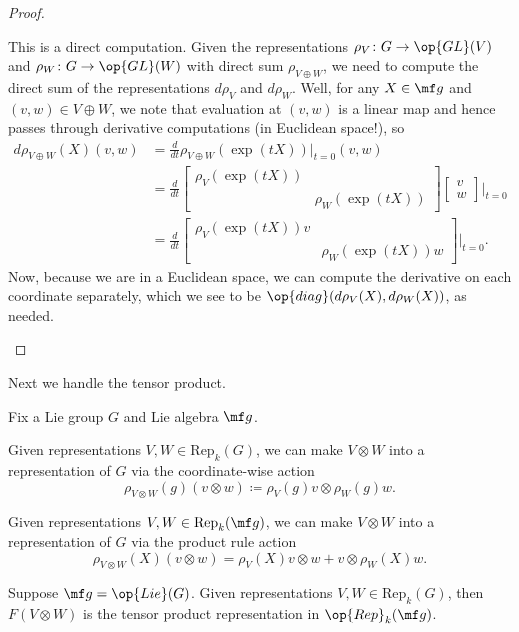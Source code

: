 \documentclass[../notes.tex]{subfiles}
\begin{document}
\begin{proof}
\begin{listalph}
		\item This is a direct computation. Given the representations $\rho_V\colon G\to\op{GL}(V)$ and $\rho_W\colon G\to\op{GL}(W)$ with direct sum $\rho_{V\oplus W}$, we need to compute the direct sum of the representations $d\rho_V$ and $d\rho_W$. Well, for any $X\in\mf g$ and $(v,w)\in V\oplus W$, we note that evaluation at $(v,w)$ is a linear map and hence passes through derivative computations (in Euclidean space!), so
		\begin{align*}
			d\rho_{V\oplus W}(X)(v,w) &= \frac d{dt}\rho_{V\oplus W}(\exp(tX))\bigg|_{t=0}(v,w) \\
			&= \frac d{dt}\begin{bmatrix}
				\rho_V(\exp(tX)) \\ & \rho_W(\exp(tX))
			\end{bmatrix}\begin{bmatrix}
				v \\ w
			\end{bmatrix}\bigg|_{t=0} \\
			&= \frac d{dt}\begin{bmatrix}
				\rho_V(\exp(tX))v \\ & \rho_W(\exp(tX))w
			\end{bmatrix}\bigg|_{t=0}.
		\end{align*}
		Now, because we are in a Euclidean space, we can compute the derivative on each coordinate separately, which we see to be $\op{diag}(d\rho_V(X),d\rho_W(X))$, as needed.
		\qedhere
	\end{listalph}
\end{proof}
Next we handle the tensor product.
\begin{lemma}
	Fix a Lie group $G$ and Lie algebra $\mf g$.
	\begin{listalph}
		\item Given representations $V,W\in\mathrm{Rep}_k(G)$, we can make $V\otimes W$ into a representation of $G$ via the coordinate-wise action
		\[\rho_{V\otimes W}(g)(v\otimes w)\coloneqq\rho_V(g)v\otimes\rho_W(g)w.\]
		\item Given representations $V,W\in\mathrm{Rep}_k(\mf g)$, we can make $V\otimes W$ into a representation of $G$ via the product rule action
		\[\rho_{V\otimes W}(X)(v\otimes w)=\rho_V(X)v\otimes w+v\otimes\rho_W(X)w.\]
		\item Suppose $\mf g=\op{Lie}(G)$. Given representations $V,W\in\mathrm{Rep}_k(G)$, then $F(V\otimes W)$ is the tensor product representation in $\op{Rep}_k(\mf g)$.
	\end{listalph}
\end{lemma}
\end{document}
